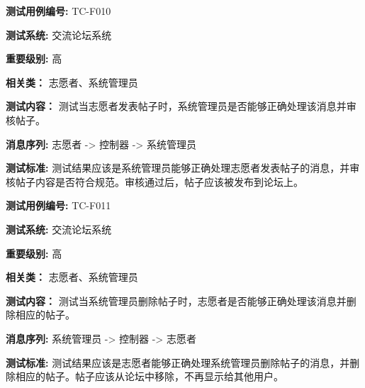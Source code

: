 \begin{framed} \textbf{测试用例编号:} TC-F010

\textbf{测试系统:} 交流论坛系统

\textbf{重要级别:} 高

\textbf{相关类：} 志愿者、系统管理员

\textbf{测试内容：} 测试当志愿者发表帖子时，系统管理员是否能够正确处理该消息并审核帖子。

\textbf{消息序列:} 志愿者 -> 控制器 -> 系统管理员

\textbf{测试标准:} 测试结果应该是系统管理员能够正确处理志愿者发表帖子的消息，并审核帖子内容是否符合规范。审核通过后，帖子应该被发布到论坛上。

\begin{center}  \end{center} \end{framed}

\begin{framed} \textbf{测试用例编号:} TC-F011

\textbf{测试系统:} 交流论坛系统

\textbf{重要级别:} 高

\textbf{相关类：} 志愿者、系统管理员

\textbf{测试内容：} 测试当系统管理员删除帖子时，志愿者是否能够正确处理该消息并删除相应的帖子。

\textbf{消息序列:} 系统管理员 -> 控制器 -> 志愿者

\textbf{测试标准:} 测试结果应该是志愿者能够正确处理系统管理员删除帖子的消息，并删除相应的帖子。帖子应该从论坛中移除，不再显示给其他用户。

\begin{center}  \end{center} \end{framed}